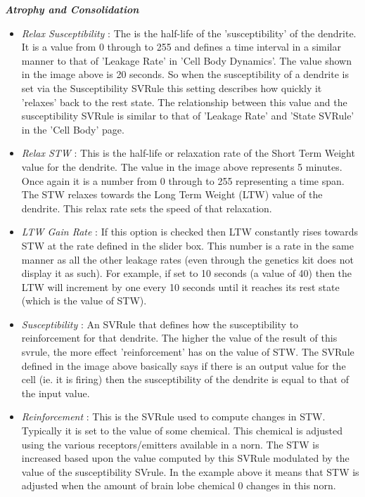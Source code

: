 \documentclass[11pt,twoside,a4paper]{article}
\begin{document}
\textbf{\textit{Atrophy and Consolidation}}
\begin{itemize}
	\item[] \emph{Relax Susceptibility} : The is the half-life of the 'susceptibility' of the dendrite. It is a value from 0 through to 255 and defines a time interval in a similar manner to that of 'Leakage Rate' in 'Cell Body Dynamics'. The value shown in the image above is 20 seconds. So when the susceptibility of a dendrite is set via the Susceptibility SVRule this setting describes how quickly it 'relaxes' back to the rest state. The relationship between this value and the susceptibility SVRule is similar to that of 'Leakage Rate' and 'State SVRule' in the 'Cell Body' page.
	\item[] \emph{Relax STW} : This is the half-life or relaxation rate of the Short Term Weight value for the dendrite. The value in the image above represents 5 minutes. Once again it is a number from 0 through to 255 representing a time span. The STW relaxes towards the Long Term Weight (LTW) value of the dendrite. This relax rate sets the speed of that relaxation.
	\item[] \emph{LTW Gain Rate} : If this option is checked then LTW constantly rises towards STW at the rate defined in the slider box. This number is a rate in the same manner as all the other leakage rates (even through the genetics kit does not display it as such). For example, if set to 10 seconds (a value of 40) then the LTW will increment by one every 10 seconds until it reaches its rest state (which is the value of STW).
	\item[] \emph{Susceptibility} : An SVRule that defines how the susceptibility to reinforcement for that dendrite. The higher the value of the result of this svrule, the more effect 'reinforcement' has on the value of STW. The SVRule defined in the image above basically says if there is an output value for the cell (ie. it is firing) then the susceptibility of the dendrite is equal to that of the input value. 
	\item[] \emph{Reinforcement} : This is the SVRule used to compute changes in STW. Typically it is set to the value of some chemical. This chemical is adjusted using the various receptors/emitters available in a norn. The STW is increased based upon the value computed by this SVRule modulated by the value of the susceptibility SVrule. In the example above it means that STW is adjusted when the amount of brain lobe chemical 0 changes in this norn.
\end{itemize}
\end{document}
